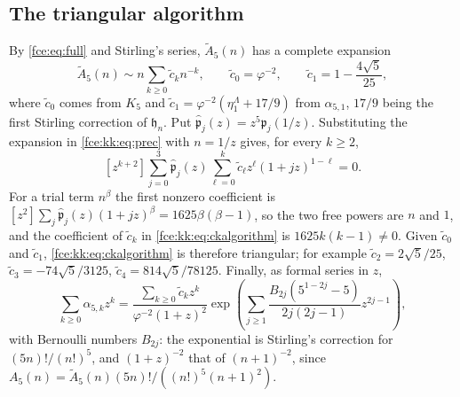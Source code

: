\documentclass[11pt,a4paper]{article}
\numberwithin{equation}{section}
\theoremstyle{definition}\newtheorem{definition}[theorem]{Definition}
\theoremstyle{remark}\newtheorem{remark}[theorem]{Remark}
\begin{document}
\subsection{The triangular algorithm}
By \eqref{fce:eq:full} and Stirling's series,
$\widetilde A_5(n)$ has a complete expansion
\begin{equation}\label{fce:kk:eq:tildeinitial}
 \widetilde A_5(n)\sim n\sum_{k\ge0}\tilde c_kn^{-k},\qquad
 \tilde c_0=\varphi^{-2},\qquad \tilde c_1=1-\frac{4\sqrt5}{25},
\end{equation}
where $\tilde c_0$ comes from $K_5$ and $\tilde c_1=\varphi^{-2}(\eta^\Lambda_1+17/9)$
from $\alpha_{5,1}$, $17/9$ being the first Stirling correction of
$\mathfrak h_n$. Put $\widehat{\mathfrak p}_j(z)=z^5\mathfrak p_j(1/z)$.
Substituting the expansion in \eqref{fce:kk:eq:prec} with $n=1/z$ gives,
for every $k\ge2$,
\begin{equation}\label{fce:kk:eq:ckalgorithm}
 [z^{k+2}]\sum_{j=0}^3\widehat{\mathfrak p}_j(z)
       \sum_{\ell=0}^k\tilde c_\ell z^\ell(1+jz)^{1-\ell}=0 .
\end{equation}
For a trial term $n^\beta$ the first nonzero coefficient is
$[z^2]\sum_j\widehat{\mathfrak p}_j(z)(1+jz)^\beta=1625\beta(\beta-1)$, so
the two free powers are $n$ and $1$, and the coefficient of $\tilde c_k$ in
\eqref{fce:kk:eq:ckalgorithm} is $1625k(k-1)\ne0$. Given $\tilde c_0$ and
$\tilde c_1$, \eqref{fce:kk:eq:ckalgorithm} is therefore triangular; for
example $\tilde c_2=2\sqrt5/25$, $\tilde c_3=-74\sqrt5/3125$,
$\tilde c_4=814\sqrt5/78125$. Finally, as formal series in $z$,
\begin{equation}\label{fce:kk:eq:dalgorithm}
 \sum_{k\ge0}\alpha_{5,k}z^k=
 \frac{\sum_{k\ge0}\tilde c_kz^k}{\varphi^{-2}(1+z)^2}
 \exp\left(\sum_{j\ge1}\frac{B_{2j}(5^{1-2j}-5)}{2j(2j-1)}z^{2j-1}\right),
\end{equation}
with Bernoulli numbers $B_{2j}$: the exponential is Stirling's correction
for $(5n)!/(n!)^5$, and $(1+z)^{-2}$ that of $(n+1)^{-2}$, since
$A_5(n)=\widetilde A_5(n)(5n)!/((n!)^5(n+1)^2)$.
\end{document}
